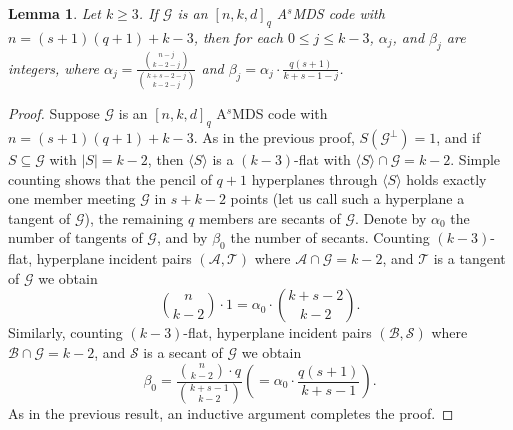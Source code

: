 \documentclass[11pt,a4paper]{amsart}
\newcommand{\AS}{ A$^s$MDS }
\newcommand{\G}{\mathcal{G}}
\theoremstyle{plain}
\newtheorem{lemma}[theorem]{Lemma}
\theoremstyle{definition}
\theoremstyle{remark}
\begin{document}
	\begin{lemma}\label{lem: alpha beta}
		Let $k\ge 3$. If $\G$ is an $[n,k,d]_q$ \AS code with $n=(s+1)(q+1)+k-3$, then for each $0\le j\le k-3$,  $\alpha_j$, and $\beta_j$ are integers, where $\alpha_j = \frac{{n-j\choose k-2-j}}{{k+s-2-j \choose k-2-j}}$ and  $\beta_j = \alpha_j \cdot  \frac{q(s+1)}{k+s-1-j}$.
	\end{lemma}
	\begin{proof}
		Suppose $\G$ is an $[n,k,d]_q$ \AS code with $n= (s+1)(q+1)+k-3$. As in the previous proof, $S(\G^\perp)=1$, and if  $S\subseteq \G$ with $|S|=k-2$, then  $\langle S \rangle$ is a $(k-3)$-flat with $\langle S \rangle \cap \G = k-2$.  Simple counting shows that the pencil of $q+1$ hyperplanes through $\langle S \rangle$ holds exactly one member meeting $\G$ in $s+k-2$ points (let us call such a hyperplane a tangent of $\G$), the remaining $q$ members are secants of $\G$. Denote by $\alpha_0$ the number of tangents of $\G$, and by $\beta_0$ the number of secants. Counting  $(k-3)$-flat, hyperplane incident pairs $(\mathcal{A},\mathcal{T})$ where $\mathcal{A}\cap \G = k-2$, and $\mathcal{T}$ is a tangent of $\G$ we obtain
		\begin{equation}
			{n\choose k-2}\cdot 1 = \alpha_0 \cdot {k+s-2 \choose k-2}.
		\end{equation}
		Similarly, counting  $(k-3)$-flat, hyperplane incident pairs $(\mathcal{B},\mathcal{S})$ where $\mathcal{B}\cap \G = k-2$, and $\mathcal{S}$ is a secant of $\G$ we obtain
		\begin{equation}
			\beta_0 = \frac{{n\choose k-2}\cdot q}{{k+s-1 \choose k-2}} \left(= \alpha_0 \cdot \frac{q(s+1)}{k+s-1}\right).
		\end{equation}
		As in the previous result, an inductive argument completes the proof.
	\end{proof}
\end{document}
